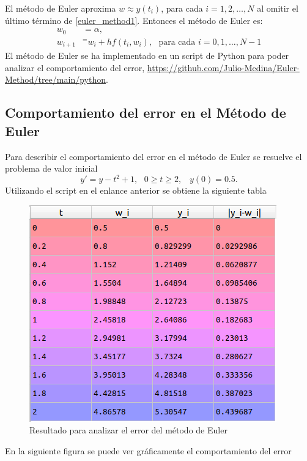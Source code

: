 \documentclass[a4paper]{article}
\begin{document}
El método de Euler aproxima $w\approx y(t_i)$, para cada $i=1,2,\hdots, N$ al omitir el último término de \ref{euler_method1}. Entonces el método de Euler es:
\begin{equation}
\begin{split}
 w_0&=\alpha,\\
 w_{i+1}&^=w_i+h f(t_i, w_i), \,\,\,\, \text{para cada } i=0,1,\hdots, N-1 
\end{split}
\end{equation} 
El método de Euler se ha implementado en un script de Python para poder analizar el comportamiento del error, \url{https://github.com/Julio-Medina/Euler-Method/tree/main/python}.
\subsection{Comportamiento del error en el Método de Euler}
Para describir el comportamiento del error en el método de Euler se resuelve el problema de valor inicial
\begin{equation*}
y'=y-t^2+1,\,\,\,\, 0\geq t\geq 2, \,\,\,\,\, y(0)=0.5.
\end{equation*}
Utilizando el script en el enlance anterior se obtiene la siguiente tabla
\begin{figure}[h]
\begin{center}
\includegraphics[scale=0.38]{./table1.png} 
\end{center} 
\caption{Resultado para analizar el error del método de Euler}

\end{figure}
En la siguiente figura se puede ver gráficamente el comportamiento del error
\end{document}
